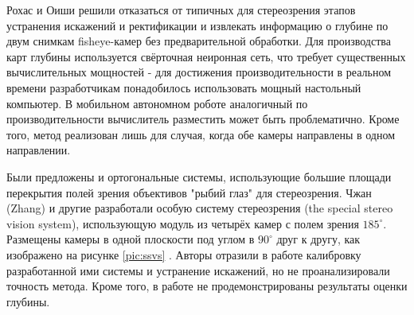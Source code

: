 Рохас и Оиши \cite{direct_neuro_stereo} решили отказаться от типичных для стереозрения этапов устранения искажений и ректификации %
и извлекать информацию о глубине по двум снимкам fisheye-камер без предварительной обработки. Для производства карт глубины используется 
свёрточная неиронная сеть, что требует существенных вычислительных мощностей - для достижения производительности в реальном 
времени разработчикам понадобилось использовать мощный настольный компьютер. В мобильном автономном роботе
аналогичный по производительности вычислитель разместить может быть проблематично. Кроме того, метод реализован лишь для случая, когда
 обе камеры направлены в одном направлении. 

Были предложены и ортогональные системы, использующие большие площади перекрытия полей зрения объективов "рыбий глаз" для 
стереозрения. %
Чжан (Zhang) и другие разработали особую систему стереозрения (the special stereo vision system), использующую модуль из четырёх камер с полем зрения
$185^\circ$. Размещены камеры в одной плоскости под углом в $90^\circ$ друг к другу, как изображено на рисунке \ref{pic:ssvs} \cite{zhang_system}.
Авторы отразили в работе калибровку разработанной ими системы и устранение искажений, но не проанализировали точность метода. Кроме того,
в работе не продемонстрированы  результаты  оценки глубины. 


